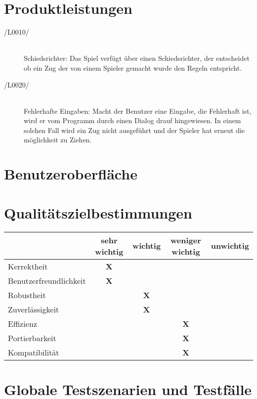 \chapter{Produktleistungen}

\begin{description}
	\item[/L0010/]~\\
		Schiedsrichter: Das Spiel verfügt über einen Schiedsrichter, der entscheidet ob ein Zug der von einem Spieler gemacht wurde den Regeln entspricht.
	\item[/L0020/]~\\
		Fehlerhafte Eingaben: Macht der Benutzer eine Eingabe, die Fehlerhaft ist, wird er vom Programm durch einen Dialog drauf hingewiesen. In einem solchen Fall wird ein Zug nicht ausgeführt und der Spieler hat erneut die möglichkeit zu Ziehen.
\end{description}



\chapter{Benutzeroberfläche}



\chapter{Qualitätszielbestimmungen}

\begin{tabular}{l|c|c|c|c}
& sehr wichtig & wichtig & weniger wichtig & unwichtig\\
\hline
\hline
Kerrektheit & \textbf{X} & & & \\ \hline
Benutzerfreundlichkeit & \textbf{X} & & & \\ \hline
Robustheit & & \textbf{X} & & \\ \hline
Zuverlässigkeit & & \textbf{X} & & \\ \hline
Effizienz & & & \textbf{X} & \\ \hline
Portierbarkeit & & & \textbf{X} & \\ \hline
Kompatibilität & & & \textbf{X} & \\ \hline
\end{tabular}


\chapter {Globale Testszenarien und Testfälle}




